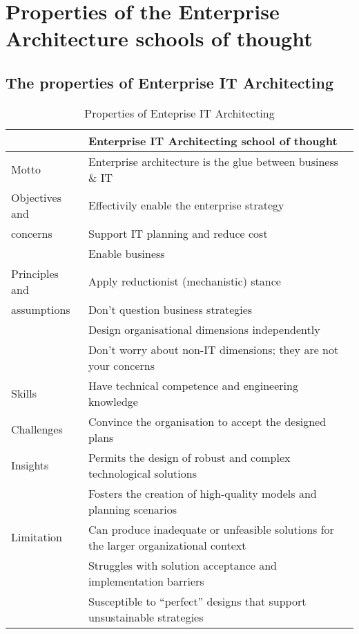\chapter{Properties of the Enterprise Architecture schools of thought}
\label{app:easchoolsproperties}

\section{The properties of Enterprise IT Architecting}
\begin{small}
\begin{longtable}{p{}p{}}
	\toprule
	& \textbf{Enterprise IT Architecting school of thought} \\ \midrule%
	\endhead%
	\hline
	\caption{Properties of Enteprise IT Architecting \parencite[p. 39]{Lapalme2012}}
	\label{tab:enterpriseitarchitecting}	
	\endfoot%
	Motto    		& Enterprise architecture is the glue between business \& IT \\
	Objectives and 	& Effectivily enable the enterprise strategy \\
	concerns		& Support IT planning and reduce cost \\
					& Enable business \\
	Principles and  & Apply reductionist (mechanistic) stance \\
	assumptions		& Don't question business strategies  \\
					& Design organisational dimensions independently \\
					& Don't worry about non-IT dimensions; they are not your concerns \\
	Skills 			& Have technical competence and engineering knowledge \\
	Challenges		& Convince the organisation to accept the designed plans \\
	Insights		& Permits the design of robust and complex technological solutions \\
					& Fosters the creation of high-quality models and planning scenarios \\
	Limitation		& Can produce inadequate or unfeasible solutions for the larger organizational context \\
					& Struggles with solution acceptance and implementation barriers \\
					& Susceptible to “perfect” designs 	that support unsustainable strategies \\
	\bottomrule
\end{longtable}
\end{small}

